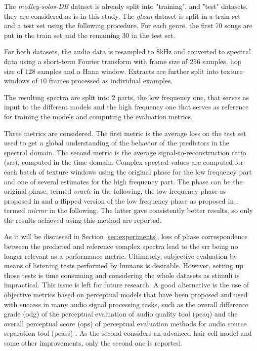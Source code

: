 \documentclass{article}
\begin{document}
The \textit{medley-solos-DB} dataset is already split into "training", and "test" datasets, they are considered as is in this study. The \textit{gtzan} dataset is split in a train set and a test set using the following procedure. For each genre, the first 70 songs are put in the train set and the remaining 30 in the test set.

For both datasets, the audio data is resampled to $8$kHz and converted to spectral data using a short-term Fourier transform with frame size of $256$ samples, hop size of $128$ samples and a Hann window. Extracts are further split into texture windows of $10$ frames processed as individual examples.

The resulting spectra are split into 2 parts, the low frequency one, that serves as input to the different models and the high frequency one that serves as reference for training the models and computing the evaluation metrics.

Three metrics are considered. The first metric is the average loss on the test set used to get a global understanding of the behavior of the predictors in the spectral domain. The second metric is the average signal-to-reconstruction ratio (srr), computed in the time domain. Complex spectral values are computed for each batch of texture windows using the original phase for the low frequency part and one of several estimates for the high frequency part. The phase can be the original phase, termed \textit{oracle} in the following, the low frequency phase as proposed in \cite{miron2018high} and a flipped version of the low frequency phase as proposed in \cite{li2015deep}, termed \textit{mirror} in the following. The latter gave consistently better results, so only the results achieved using this method are reported.

As it will be discussed in Section \ref{sec:experiments}, loss of phase correspondence between the predicted and reference complex spectra lead to the srr being no longer relevant as a performance metric. Ultimately, subjective evaluation by means of listening tests performed by humans is desirable. However, setting up those tests is time consuming and considering the whole datasets as stimuli is impractical. This issue is left for future research. A good alternative is the use of objective metrics based on perceptual models that have been proposed and used with success in many audio signal processing tasks, such as the overall difference grade (odg) of the perceptual evaluation of audio quality tool (peaq) \cite{thiede2000peaq} and the overall perceptual score (ops) of perceptual evaluation methods for audio source separation tool (peass) \cite{emiya2011subjective}. As the second considers an advanced hair cell model and some other improvements, only the second one is reported.
\end{document}
